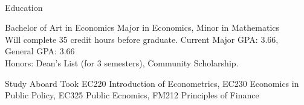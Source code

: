 \documentclass[]{resume-knyte}
\begin{document}



\begin{subheader}{1}
    \\

\end{subheader}

\begin{topic}{Education}


    {Bachelor of Art in Economics}
    {Major in Economics, Minor in Mathematics\\
    Will complete 35 credit hours before graduate. Current Major GPA: 3.66, General GPA: 3.66\\
    Honors: Dean's List (for 3 semesters), Community Scholarship.}


    {Study Aboard}
    {Took EC220 Introduction of Econometrics, EC230 Economics in Public Policy,
    EC325 Public Ecnomics, FM212 Principles of Finance}

    \\ %
\end{topic}
\end{document}
